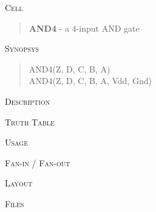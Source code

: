 
\label{AND4}
\textsc{Cell}
\begin{quote}
    \textbf{AND4} - a 4-input AND gate
\end{quote}

\textsc{Synopsys}
\begin{quote}
    AND4(Z, D, C, B, A) \\
    AND4(Z, D, C, B, A, Vdd, Gnd)
\end{quote}

\textsc{Description}

%

\textsc{Truth Table}


\textsc{Usage}

\textsc{Fan-in / Fan-out}

\textsc{Layout}

\textsc{Files}
